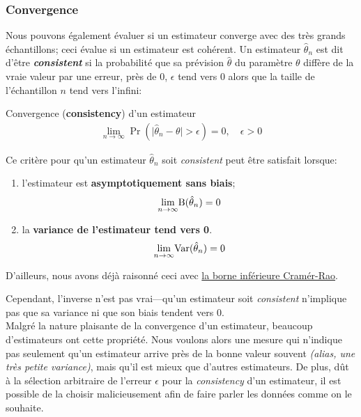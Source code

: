 \documentclass[10pt, french]{article}
\begin{document}
\begin{multicols*}{2}
\subsubsection{Convergence}
Nous pouvons également évaluer si un estimateur converge avec des très grands échantillons; ceci évalue si un estimateur est cohérent. Un estimateur $\hat{\theta}_{n}$ est dit d'être \og \textit{\textbf{consistent}} \fg{} si la probabilité que sa prévision $\hat{\theta}$ du paramètre $\theta$ diffère de la vraie valeur par une erreur, près de 0, $\epsilon$ tend vers 0 alors que la taille de l'échantillon $n$ tend vers l'infini:
\begin{algo}{Convergence (\textbf{consistency}) d'un estimateur}
\begin{align*}
	\underset{n \rightarrow \infty}{\lim} \Pr(\big| \hat{\theta}_{n} - \theta \big| > \epsilon) = 0, \quad \epsilon > 0
\end{align*}
\end{algo}

Ce critère pour qu'un estimateur $\hat{\theta}_{n}$ soit \og \textit{consistent} \fg{} peut être satisfait lorsque: 
\begin{enumerate}
	\item	l'estimateur est \hypertarget{asympto}{\textbf{asymptotiquement sans biais}};
		\begin{align*}
		\underset{n \rightarrow \infty}{\lim} \text{B}(\hat{\theta}_{n}) = 0
		\end{align*}
	\item	la \textbf{variance de l'estimateur tend vers 0}.
		\begin{align*}
		\underset{n \rightarrow \infty}{\lim} \text{Var}(\hat{\theta}_{n}) = 0
		\end{align*}
\end{enumerate}

D'ailleurs, nous avons déjà raisonné ceci avec \hyperlink{cramer-rao}{la borne inférieure Cramér-Rao}.

Cependant, l'inverse n'est pas vrai---qu'un estimateur soit \og \textit{consistent} \fg{} n'implique pas que sa variance ni que son biais tendent vers 0.\\

Malgré la nature plaisante de la convergence d'un estimateur, beaucoup d'estimateurs ont cette propriété. 
Nous voulons alors une mesure qui n'indique pas seulement qu'un estimateur arrive près de la bonne valeur souvent \textit{(alias, une très petite variance)}, mais qu'il est mieux que d'autres estimateurs.
De plus, dût à la sélection arbitraire de l'erreur $\epsilon$ pour la \textit{consistency} d'un estimateur, il est possible de la choisir malicieusement afin de faire parler les données comme on le souhaite. 


\end{multicols*}
\end{document}
